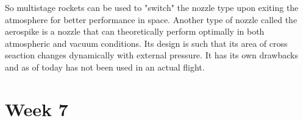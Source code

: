 \documentclass[12pt, letterpaper]{article}
\begin{document}
So multistage rockets can be used to "switch" the nozzle type upon exiting the atmosphere for better performance in space. Another type of nozzle called the aerospike is a nozzle that can theoretically perform optimally in both atmospheric and vacuum conditions. Its design is such that its area of cross seaction changes dynamically with external pressure. It has its own drawbacks and as of today has not been used in an actual flight.

\newpage

\section{Week 7}
\end{document}
